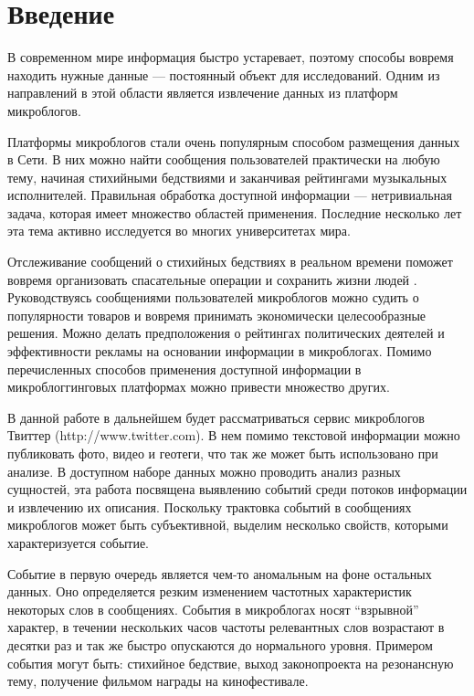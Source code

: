 \documentclass[14pt,a4paper,oneside]{extarticle}
\begin{document}
\newpage

\tableofcontents
\thispagestyle{empty}\newpage

  \section*{Введение}
  	В современном мире информация быстро устаревает, поэтому способы вовремя находить нужные данные --- постоянный объект для исследований. Одним из направлений в этой области является извлечение данных из платформ микроблогов.
  	
  	Платформы микроблогов стали очень популярным способом размещения данных в Сети. В них можно найти сообщения пользователей практически на любую тему, начиная стихийными бедствиями и заканчивая рейтингами музыкальных исполнителей. Правильная обработка доступной информации --- нетривиальная задача, которая имеет множество областей применения. Последние несколько лет эта тема активно исследуется во многих университетах мира.
  	
	Отслеживание сообщений о стихийных бедствиях в реальном времени поможет вовремя организовать спасательные операции и сохранить жизни людей \cite{nuggets}. Руководствуясь сообщениями пользователей микроблогов можно судить о популярности товаров и вовремя принимать экономически целесообразные решения. Можно делать предположения о рейтингах политических деятелей и эффективности рекламы на основании информации в микроблогах. Помимо перечисленных способов применения доступной информации в микроблоггинговых платформах можно привести множество других.
	
	В данной работе в дальнейшем будет рассматриваться сервис микроблогов Твиттер (http://www.twitter.com). В нем помимо текстовой информации можно публиковать фото, видео и геотеги, что так же может быть использовано при анализе. В доступном наборе данных можно проводить анализ разных сущностей, эта работа посвящена выявлению событий среди потоков информации и извлечению их описания. Поскольку трактовка событий в сообщениях микроблогов может быть субъективной, выделим несколько свойств, которыми характеризуется событие.
	
	Событие в первую очередь является чем-то аномальным на фоне остальных данных. Оно определяется резким изменением частотных характеристик некоторых слов в сообщениях. События в микроблогах носят ``взрывной'' характер, в течении нескольких часов частоты релевантных слов возрастают в десятки раз и так же быстро опускаются до нормального уровня. Примером события могут быть: стихийное бедствие, выход законопроекта на резонансную тему, получение фильмом награды на кинофестивале.
	
\end{document}
